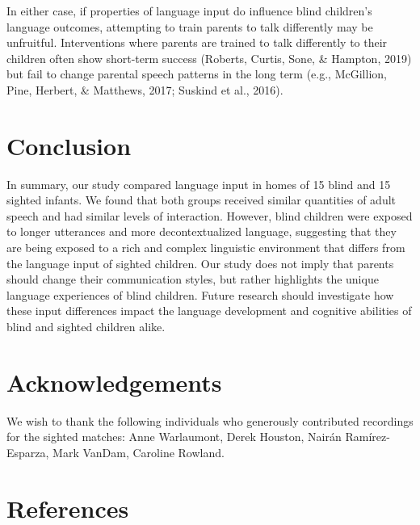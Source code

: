 \documentclass[
  man]{apa6}
\begin{document}
In either case, if properties of language input do influence blind children's language outcomes, attempting to train parents to talk differently may be unfruitful. Interventions where parents are trained to talk differently to their children often show short-term success (Roberts, Curtis, Sone, \& Hampton, 2019) but fail to change parental speech patterns in the long term (e.g., McGillion, Pine, Herbert, \& Matthews, 2017; Suskind et al., 2016).

\hypertarget{conclusion}{%
\section{Conclusion}\label{conclusion}}

In summary, our study compared language input in homes of 15 blind and 15 sighted infants. We found that both groups received similar quantities of adult speech and had similar levels of interaction. However, blind children were exposed to longer utterances and more decontextualized language, suggesting that they are being exposed to a rich and complex linguistic environment that differs from the language input of sighted children. Our study does not imply that parents should change their communication styles, but rather highlights the unique language experiences of blind children. Future research should investigate how these input differences impact the language development and cognitive abilities of blind and sighted children alike.

\hypertarget{acknowledgements}{%
\section{Acknowledgements}\label{acknowledgements}}

We wish to thank the following individuals who generously contributed recordings for the sighted matches: Anne Warlaumont, Derek Houston, Nairán Ramírez-Esparza, Mark VanDam, Caroline Rowland.

\hypertarget{references}{%
\section*{References}\label{references}}
\end{document}
